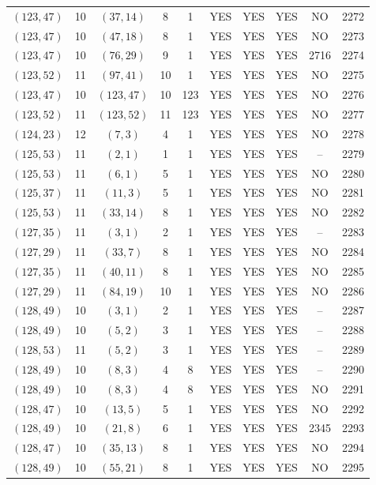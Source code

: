 \begin{longtable}{|c|c|c|c|c|c|c|c|c|c|}
$(123, 47)$ & 10 & $(37, 14)$ & 8 & 1 & YES & YES & YES & NO & 2272\\
$(123, 47)$ & 10 & $(47, 18)$ & 8 & 1 & YES & YES & YES & NO & 2273\\
$(123, 47)$ & 10 & $(76, 29)$ & 9 & 1 & YES & YES & YES & 2716 & 2274\\
$(123, 52)$ & 11 & $(97, 41)$ & 10 & 1 & YES & YES & YES & NO & 2275\\
$(123, 47)$ & 10 & $(123, 47)$ & 10 & 123 & YES & YES & YES & NO & 2276\\
$(123, 52)$ & 11 & $(123, 52)$ & 11 & 123 & YES & YES & YES & NO & 2277\\
$(124, 23)$ & 12 & $(7, 3)$ & 4 & 1 & YES & YES & YES & NO & 2278\\
$(125, 53)$ & 11 & $(2, 1)$ & 1 & 1 & YES & YES & YES & -- & 2279\\
$(125, 53)$ & 11 & $(6, 1)$ & 5 & 1 & YES & YES & YES & NO & 2280\\
$(125, 37)$ & 11 & $(11, 3)$ & 5 & 1 & YES & YES & YES & NO & 2281\\
$(125, 53)$ & 11 & $(33, 14)$ & 8 & 1 & YES & YES & YES & NO & 2282\\
$(127, 35)$ & 11 & $(3, 1)$ & 2 & 1 & YES & YES & YES & -- & 2283\\
$(127, 29)$ & 11 & $(33, 7)$ & 8 & 1 & YES & YES & YES & NO & 2284\\
$(127, 35)$ & 11 & $(40, 11)$ & 8 & 1 & YES & YES & YES & NO & 2285\\
$(127, 29)$ & 11 & $(84, 19)$ & 10 & 1 & YES & YES & YES & NO & 2286\\
$(128, 49)$ & 10 & $(3, 1)$ & 2 & 1 & YES & YES & YES & -- & 2287\\
$(128, 49)$ & 10 & $(5, 2)$ & 3 & 1 & YES & YES & YES & -- & 2288\\
$(128, 53)$ & 11 & $(5, 2)$ & 3 & 1 & YES & YES & YES & -- & 2289\\
$(128, 49)$ & 10 & $(8, 3)$ & 4 & 8 & YES & YES & YES & -- & 2290\\
$(128, 49)$ & 10 & $(8, 3)$ & 4 & 8 & YES & YES & YES & NO & 2291\\
$(128, 47)$ & 10 & $(13, 5)$ & 5 & 1 & YES & YES & YES & NO & 2292\\
$(128, 49)$ & 10 & $(21, 8)$ & 6 & 1 & YES & YES & YES & 2345 & 2293\\
$(128, 47)$ & 10 & $(35, 13)$ & 8 & 1 & YES & YES & YES & NO & 2294\\
$(128, 49)$ & 10 & $(55, 21)$ & 8 & 1 & YES & YES & YES & NO & 2295\\

\end{longtable}
